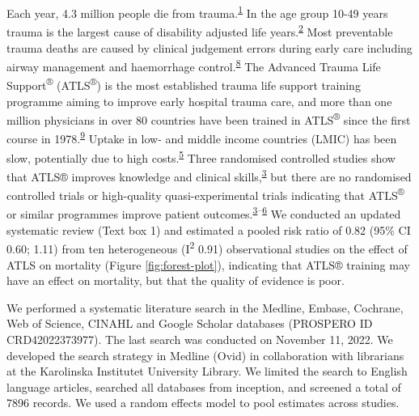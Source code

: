 \documentclass[
  11pt,
]{article}
\begin{document}
Each year, 4.3 million people die from trauma.\textsuperscript{\protect\hyperlink{ref-injuries2020}{1}} In the age group 10-49 years trauma is the largest cause of disability adjusted life years.\textsuperscript{\protect\hyperlink{ref-GBD2020}{2}} Most preventable trauma deaths are caused by clinical judgement errors during early care including airway management and haemorrhage control.\textsuperscript{\protect\hyperlink{ref-Roy2017}{8}} The Advanced Trauma Life Support\textsuperscript{®} (ATLS\textsuperscript{®}) is the most established trauma life support training programme aiming to improve early hospital trauma care, and more than one million physicians in over 80 countries have been trained in ATLS\textsuperscript{®} since the first course in 1978.\textsuperscript{\protect\hyperlink{ref-acsAtls2018}{9}} Uptake in low- and middle income countries (LMIC) has been slow, potentially due to high costs.\textsuperscript{\protect\hyperlink{ref-Kadhum2020}{5}} Three randomised controlled studies show that ATLS® improves knowledge and clinical skills,\textsuperscript{\protect\hyperlink{ref-Mohammad2013}{3}} but there are no randomised controlled trials or high-quality quasi-experimental trials indicating that ATLS\textsuperscript{®} or similar programmes improve patient outcomes.\textsuperscript{\protect\hyperlink{ref-Mohammad2013}{3}--\protect\hyperlink{ref-Jin2021}{6}} We conducted an updated systematic review (Text box 1) and estimated a pooled risk ratio of 0.82 (95\% CI 0.60; 1.11) from ten heterogeneous (I\textsuperscript{2} 0.91) observational studies on the effect of ATLS on mortality (Figure \ref{fig:forest-plot}), indicating that ATLS® training may have an effect on mortality, but that the quality of evidence is poor.

\begin{textbox}
\begin{mdframed}[frametitle={Text box 1: Systematic Review}, nobreak=true, backgroundcolor=blue!10]
We performed a systematic literature search in the Medline, Embase, Cochrane, Web of Science, CINAHL and Google Scholar databases (PROSPERO ID CRD42022373977). The last search was conducted on November 11, 2022. We developed the search strategy in Medline (Ovid) in collaboration with librarians at the Karolinska Institutet University Library. We limited the search to English language articles, searched all databases from inception, and screened a total of 7896 records. We used a random effects model to pool estimates across studies.
\end{mdframed}
\end{textbox}
\end{document}
